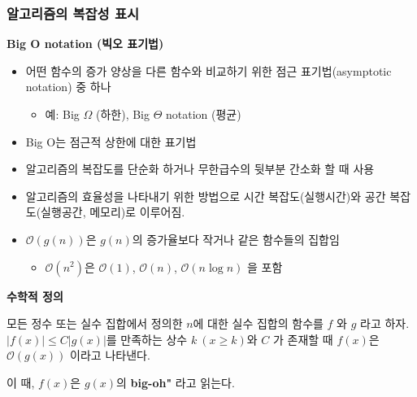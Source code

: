 \documentclass[
  11pt,
]{krantz}
\makeatletter
\providecommand{\tightlist}{%
  \setlength{\itemsep}{0pt}\setlength{\parskip}{0pt}}
\newenvironment{kframe}{%
\medskip{}
\setlength{\fboxsep}{.8em}
 \def\at@end@of@kframe{}%
 \ifinner\ifhmode%
  \def\at@end@of@kframe{\end{minipage}}%
  \begin{minipage}{\columnwidth}%
 \fi\fi%
 \def\FrameCommand##1{\hskip\@totalleftmargin \hskip-\fboxsep
 \colorbox{shadecolor}{##1}\hskip-\fboxsep
     \hskip-\linewidth \hskip-\@totalleftmargin \hskip\columnwidth}%
 \MakeFramed {\advance\hsize-\width
   \@totalleftmargin\z@ \linewidth\hsize
   \@setminipage}}%
 {\par\unskip\endMakeFramed%
 \at@end@of@kframe}
\renewenvironment{quote}{\begin{kframe}}{\end{kframe}}
\makeatother
\begin{document}
\hypertarget{uxc54cuxace0uxb9acuxc998uxc758-uxbcf5uxc7a1uxc131-uxd45cuxc2dc}{%
\subsubsection*{알고리즘의 복잡성 표시}\label{uxc54cuxace0uxb9acuxc998uxc758-uxbcf5uxc7a1uxc131-uxd45cuxc2dc}}


\textbf{Big O notation (빅오 표기법)}

\begin{itemize}
\tightlist
\item
  어떤 함수의 증가 양상을 다른 함수와 비교하기 위한 점근 표기법(asymptotic notation)
  중 하나

  \begin{itemize}
  \tightlist
  \item
    예: Big \(\Omega\) (하한), Big \(\Theta\) notation (평균)
  \end{itemize}
\item
  Big O는 점근적 상한에 대한 표기법\\
\item
  알고리즘의 복잡도를 단순화 하거나 무한급수의 뒷부분 간소화 할 때 사용
\item
  알고리즘의 효율성을 나타내기 위한 방법으로 시간 복잡도(실행시간)와 공간
  복잡도(실행공간, 메모리)로 이루어짐.
\item
  \(\mathcal{O}(g(n))\)은 \(g(n)\)의 증가율보다 작거나 같은 함수들의 집합임

  \begin{itemize}
  \tightlist
  \item
    \(\mathcal{O}(n^2)\)은 \(\mathcal{O}(1)\), \(\mathcal{O}(n)\), \(\mathcal{O}(n\log n)\) 을
    포함
  \end{itemize}
\end{itemize}

\textbf{수학적 정의}

\begin{quote}
모든 정수 또는 실수 집합에서 정의한 \(n\)에 대한 실수 집합의 함수를
\(f\) 와 \(g\) 라고 하자. \(|f(x)| \leq C |g(x)|\)를 만족하는 상수
\(k~(x \geq k)\)와 \(C\) 가 존재할 때
\(f(x)\)은 \(\mathcal{O}(g(x))\) 이라고 나타낸다.

이 때, \(f(x)\)은 \(g(x)\)의 \textbf{big-oh"} 라고 읽는다.
\end{quote}

\footnotesize
\end{document}

